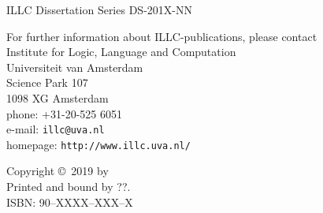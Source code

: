 
{\pagestyle{empty}

\newcommand{\printtitle}{{\Huge\bf \thetitle}}

\begin{titlepage}
\par\vskip 2cm
\begin{center}
\printtitle
\vfill
{\LARGE\bf \theauthor}
\vskip 2cm
\end{center}
\end{titlepage}

\mbox{}\newpage
\setcounter{page}{1}

\par\vskip 2cm
\begin{center}
\printtitle
\end{center}

\clearpage
\par\vskip 2cm
\begin{center}
ILLC Dissertation Series DS-201X-NN                         %
\par\vspace {2cm}
\illclogo{10cm}
\par\vspace {2cm}
\noindent%
For further information about ILLC-publications, please contact\\[2ex]
Institute for Logic, Language and Computation\\
Universiteit van Amsterdam\\
Science Park 107\\
1098 XG Amsterdam\\
phone: +31-20-525 6051\\
e-mail: {\tt illc@uva.nl}\\
homepage: {\tt http://www.illc.uva.nl/}
\end{center}
\vfill

\noindent%
Copyright \copyright\ 2019 by \theauthor \\[2ex]
Printed and bound by ??.\\[2ex]                             %
ISBN: 90--XXXX--XXX--X                                      %

}
